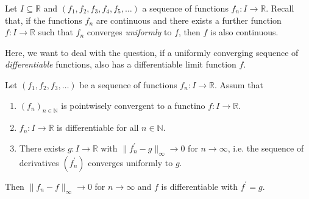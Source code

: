 
Let $I \subseteq \mathbb{R}$ and $(f_1, f_2, f_3, f_4, f_5,\dots)$ a sequence of functions $f_n \colon I \to \mathbb{R}$. 
Recall that, if the functions $f_n$ are continuous and there exists a further function $f\colon I \to \mathbb{R}$ such that $f_n$ converges \emph{uniformly} to $f$, then $f$ is also continuous.

Here, we want to deal with the question, if a uniformly converging sequence of \emph{differentiable} functions, also has a differentiable limit function $f$.

\begin{theorem}
Let $(f_1, f_2, f_3, \dots)$ be a sequence of functions $f_n \colon I \to \mathbb{R}$.
Assum that
\begin{enumerate}
\item $(f_n)_{n \in \mathbb{N}}$ is pointwisely convergent to a functino $f \colon I \to \mathbb{R}$.
\item $f_n \colon I \to \mathbb{R}$ is differentiable for all $n \in \mathbb{N}$.
\item There exists $g \colon I \to \mathbb{R}$ with $\|f_n^\prime - g \|_\infty \to 0$ for $n \to \infty$, i.e. the sequence of derivatives $(f_n^\prime)$ converges uniformly to $g$.
\end{enumerate}
Then $\|f_n - f\|_\infty \to 0$ for $n \to \infty$ and $f$ is differentiable with $f^\prime = g$.
\end{theorem}

